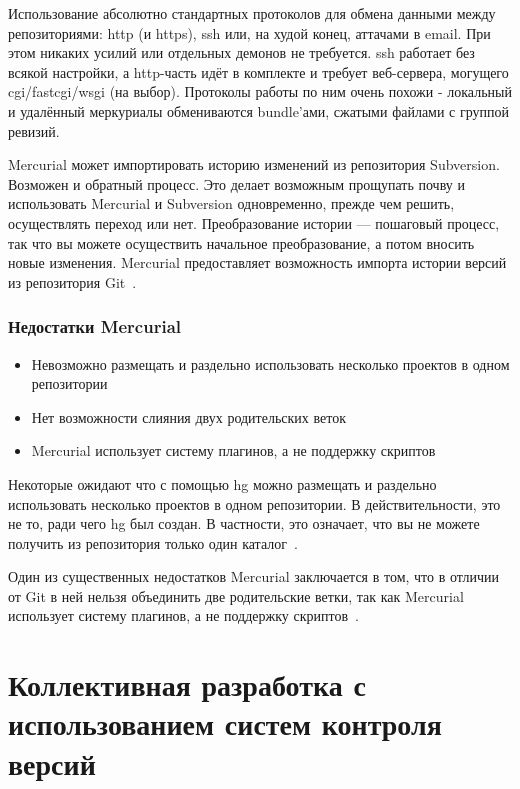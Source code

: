 \documentclass{../industrial-development}
\begin{document}
Использование абсолютно стандартных протоколов для обмена данными между репозиториями: http (и https), ssh или, на худой конец, аттачами в email.
При этом никаких усилий или отдельных демонов не требуется. ssh работает без всякой настройки, а http-часть идёт в комплекте и требует веб-сервера, могущего cgi/fastcgi/wsgi (на выбор). Протоколы работы по ним очень похожи - локальный и удалённый меркуриалы обмениваются bundle’ами, сжатыми файлами с группой ревизий.

Mercurial может импортировать историю изменений из репозитория Subversion. Возможен и обратный процесс. Это делает возможным прощупать почву и использовать Mercurial и Subversion одновременно, прежде чем решить, осуществлять переход или нет. Преобразование истории — пошаговый процесс, так что вы можете осуществить начальное преобразование, а потом вносить новые изменения.
Mercurial предоставляет возможность импорта истории версий из репозитория Git~\cite[с.~7--9]{MercurialOReilly}.

\begin{frame} \frametitle{Недостатки Mercurial}
  
  \begin{itemize}
  \item Невозможно размещать и раздельно использовать несколько проектов в одном репозитории
  \item Нет возможности слияния двух родительских веток
  \item Mercurial использует систему плагинов, а не поддержку скриптов
  \end{itemize}
\end{frame}

\lecturenotes

Некоторые ожидают что с помощью hg можно размещать и раздельно использовать несколько проектов в одном репозитории. В действительности, это не то, ради чего hg был создан. В частности, это означает, что вы не можете получить из репозитория только один каталог~\cite{MercurialWiki}.

Один из существенных недостатков Mercurial заключается в том, что в отличии от Git в ней нельзя объединить две родительские ветки, так как Mercurial использует систему плагинов, а не поддержку скриптов~\cite{MercurialTD}.

\section{Коллективная разработка с использованием систем контроля версий}
\end{document}
